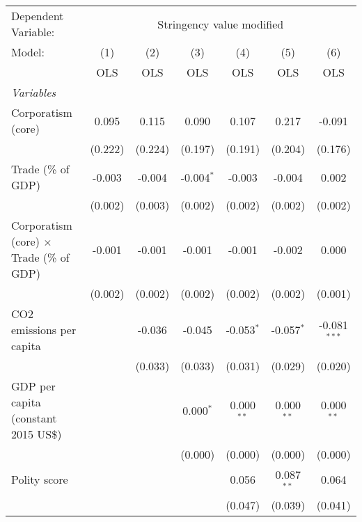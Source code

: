 
\begingroup
\centering
\begin{tabular}{lcccccc}
   \toprule
   Dependent Variable: & \multicolumn{6}{c}{Stringency value modified}\\
   Model:                                          & (1)     & (2)     & (3)          & (4)          & (5)          & (6)\\  
                                                   &  OLS    & OLS     & OLS          & OLS          & OLS          & OLS\\  
   \midrule
   \emph{Variables}\\
   Corporatism (core)                              & 0.095   & 0.115   & 0.090        & 0.107        & 0.217        & -0.091\\   
                                                   & (0.222) & (0.224) & (0.197)      & (0.191)      & (0.204)      & (0.176)\\   
   Trade (\% of GDP)                               & -0.003  & -0.004  & -0.004$^{*}$ & -0.003       & -0.004       & 0.002\\   
                                                   & (0.002) & (0.003) & (0.002)      & (0.002)      & (0.002)      & (0.002)\\   
   Corporatism (core) $\times$ Trade (\% of GDP)   & -0.001  & -0.001  & -0.001       & -0.001       & -0.002       & 0.000\\   
                                                   & (0.002) & (0.002) & (0.002)      & (0.002)      & (0.002)      & (0.001)\\   
   CO2 emissions per capita                        &         & -0.036  & -0.045       & -0.053$^{*}$ & -0.057$^{*}$ & -0.081$^{***}$\\   
                                                   &         & (0.033) & (0.033)      & (0.031)      & (0.029)      & (0.020)\\   
   GDP per capita (constant 2015 US\$)             &         &         & 0.000$^{*}$  & 0.000$^{**}$ & 0.000$^{**}$ & 0.000$^{**}$\\   
                                                   &         &         & (0.000)      & (0.000)      & (0.000)      & (0.000)\\   
   Polity score                                    &         &         &              & 0.056        & 0.087$^{**}$ & 0.064\\   
                                                   &         &         &              & (0.047)      & (0.039)      & (0.041)\\   

\end{tabular}
